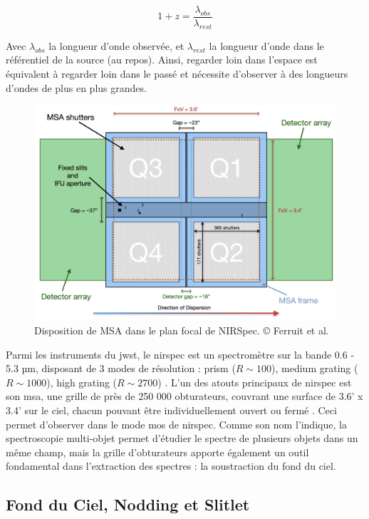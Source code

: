 \documentclass[11pt, a4paper]{article}
\begin{document}
\begin{equation}
    1 + z = \frac{\lambda_{obs}}{\lambda_{rest}}
\end{equation}

Avec $\lambda_{obs}$ la longueur d'onde observée, et $\lambda_{rest}$ la longueur d'onde dans le référentiel de la source (au repos). Ainsi, regarder loin dans l'espace est équivalent à regarder loin dans le passé et nécessite d'observer à des longueurs d'ondes de plus en plus grandes.

\begin{figure}[H]
  \centering
  \includegraphics[scale=0.25]{assets/msa_ds_new.png}
  \caption{Disposition de MSA dans le plan focal de NIRSpec. {\tiny \copyright} Ferruit et al. \cite{2022A&A...661A..81F}}
\end{figure}

Parmi les instruments du \gls{jwst}, le \gls{nirspec} est un spectromètre sur la bande 0.6 - 5.3  µm, disposant de 3 modes de résolution : prism ($R \sim 100$), medium grating ($R \sim 1000$), high grating ($R \sim 2700$) \cite{nirspec}. L'un des atouts principaux de \gls{nirspec} est son \gls{msa}, une grille de près de 250 000 obturateurs, couvrant une surface de 3.6' x 3.4' sur le ciel, chacun pouvant être individuellement ouvert ou fermé \cite{msa}. Ceci permet d'observer dans le mode \gls{mos} de \gls{nirspec}. Comme son nom l'indique, la spectroscopie multi-objet permet d'étudier le spectre de plusieurs objets dans un même champ, mais la grille d'obturateurs apporte également un outil fondamental dans l'extraction des spectres : la soustraction du fond du ciel.

\subsection{Fond du Ciel, Nodding et Slitlet}









\printnoidxglossaries

\printbibliography %
\end{document}
